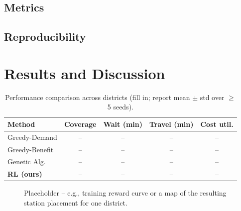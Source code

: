 \documentclass[conference]{IEEEtran}
\begin{document}
\subsection{Metrics}

\subsection{Reproducibility}

\section{Results and Discussion}

\begin{table}[t]
\centering
\caption{Performance comparison across districts (fill in; report mean $\pm$ std over $\geq$5 seeds).}
\label{tab:results}
\begin{tabular}{lcccc}
\toprule
Method & Coverage & Wait (min) & Travel (min) & Cost util. \\
\midrule
Greedy-Demand   & -- & -- & -- & -- \\
Greedy-Benefit  & -- & -- & -- & -- \\
Genetic Alg.    & -- & -- & -- & -- \\
\textbf{RL (ours)} & -- & -- & -- & -- \\
\bottomrule
\end{tabular}
\end{table}

\begin{figure}[t]
\centering
\caption{Placeholder -- e.g., training reward curve or a map of the
resulting station placement for one district.}
\label{fig:placeholder}
\end{figure}
\end{document}
